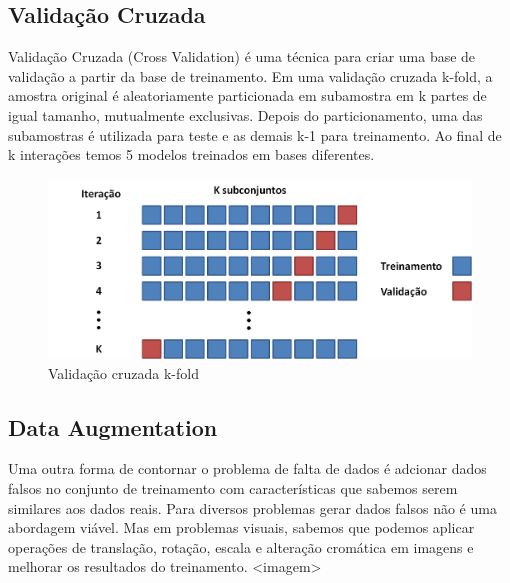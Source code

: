 \documentclass[conference]{IEEEtran}
\begin{document}
 
\subsection{Validação Cruzada}
Validação Cruzada (Cross Validation) é uma técnica para criar uma base de validação a partir da base de treinamento. Em uma validação cruzada k-fold, a amostra original é aleatoriamente particionada em subamostra em k partes de igual tamanho, mutualmente exclusivas.  Depois do particionamento, uma das subamostras é utilizada para teste e as demais k-1 para treinamento. Ao final de k interações temos 5 modelos treinados em bases diferentes.
\begin{figure}[ht!]
\begin{center}
\includegraphics[width=.65\columnwidth]{k-fold.png}
\caption{Validação cruzada k-fold}
\end{center}
\end{figure}
\subsection{Data Augmentation}
Uma outra forma de contornar o problema de falta de dados é adcionar dados falsos no conjunto de treinamento com características que sabemos serem similares aos dados reais. Para diversos problemas gerar dados falsos não é uma abordagem viável. Mas em problemas visuais, sabemos que podemos aplicar operações de translação, rotação, escala e alteração cromática em imagens e melhorar os resultados do treinamento.
<imagem>
\end{document}
